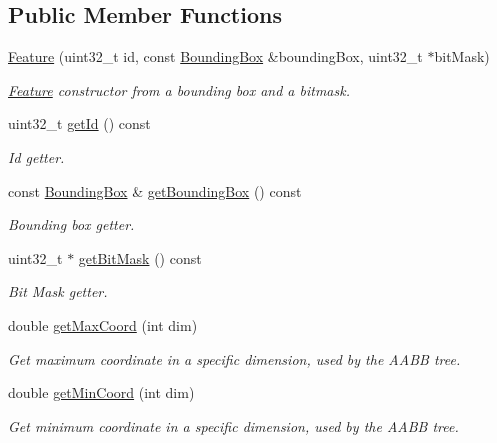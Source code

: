 \subsection*{Public Member Functions}
\begin{DoxyCompactItemize}
\item 
\hyperlink{classfc_1_1Feature_a3cf1b0876a3bf6df2de24365ab640adb}{Feature} (uint32\+\_\+t id, const \hyperlink{classfc_1_1BoundingBox}{Bounding\+Box} \&bounding\+Box, uint32\+\_\+t $\ast$bit\+Mask)
\begin{DoxyCompactList}\small\item\em \hyperlink{classfc_1_1Feature}{Feature} constructor from a bounding box and a bitmask. \end{DoxyCompactList}\item 
uint32\+\_\+t \hyperlink{classfc_1_1Feature_aaca79900d55dd3e037e8edfe36330af0}{get\+Id} () const
\begin{DoxyCompactList}\small\item\em Id getter. \end{DoxyCompactList}\item 
const \hyperlink{classfc_1_1BoundingBox}{Bounding\+Box} \& \hyperlink{classfc_1_1Feature_ac5793261f78e3cd9ec934b1f70ef4725}{get\+Bounding\+Box} () const
\begin{DoxyCompactList}\small\item\em Bounding box getter. \end{DoxyCompactList}\item 
uint32\+\_\+t $\ast$ \hyperlink{classfc_1_1Feature_a965a679e9a751be23d2a7d51c0573a61}{get\+Bit\+Mask} () const
\begin{DoxyCompactList}\small\item\em Bit Mask getter. \end{DoxyCompactList}\item 
double \hyperlink{classfc_1_1Feature_acaef36b11296ff7130d9454a0195148d}{get\+Max\+Coord} (int dim)
\begin{DoxyCompactList}\small\item\em Get maximum coordinate in a specific dimension, used by the A\+A\+BB tree. \end{DoxyCompactList}\item 
double \hyperlink{classfc_1_1Feature_a034cb38f61076e527f4f16eecb97c0b4}{get\+Min\+Coord} (int dim)
\begin{DoxyCompactList}\small\item\em Get minimum coordinate in a specific dimension, used by the A\+A\+BB tree. \end{DoxyCompactList}\item 

\end{DoxyCompactItemize}

